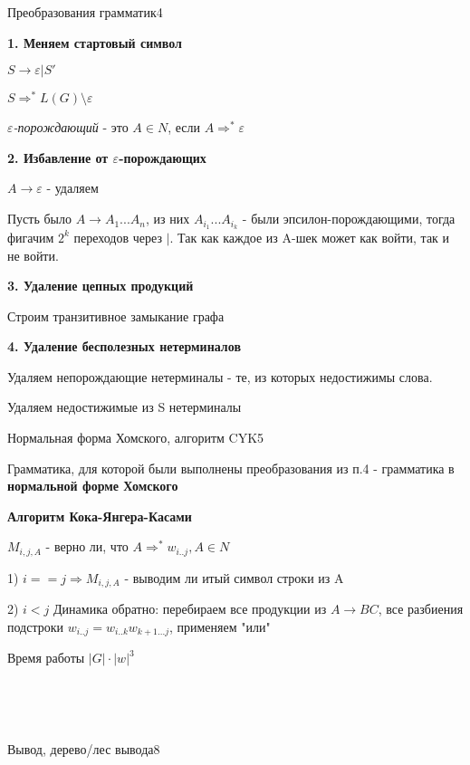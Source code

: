 \documentclass{article}
\begin{document}
\begin{question}{Преобразования грамматик}{4}

\textbf{1. Меняем стартовый символ}

$S \rightarrow \varepsilon |S'$

$S \Rightarrow^* L(G) \setminus {\varepsilon}$

\textit{$\varepsilon$-порождающий} - это $A \in N$, если $A \Rightarrow^* \varepsilon$

\textbf{2. Избавление от $\varepsilon$-порождающих}

$A \rightarrow \varepsilon$ - удаляем

Пусть было $A \rightarrow A_1 ... A_n$, из них $A_{i_1} ... A_{i_k}$ - были эпсилон-порождающими, тогда фигачим $2^k$ переходов через $|$. Так как каждое из A-шек может как войти, так и не войти.

\textbf{3. Удаление цепных продукций}

Строим транзитивное замыкание графа

\textbf{4. Удаление бесполезных нетерминалов}

Удаляем непорождающие нетерминалы - те, из которых недостижимы слова.

Удаляем недостижимые из S нетерминалы

\end{question}



\begin{question}{Нормальная форма Хомского, алгоритм CYK}{5}

Грамматика, для которой были выполнены преобразования из п.4 - грамматика в \textbf{нормальной форме Хомского}

\textbf{Алгоритм Кока-Янгера-Касами}

$M_{i,j,A}$ - верно ли, что $A \Rightarrow^* w_{i..j}, A \in N$

1) $i == j \Rightarrow M_{i,j,A}$ - выводим ли итый символ строки из A

2) $i < j$ Динамика обратно: перебираем все продукции из $A \rightarrow BC$, все разбиения подстроки $w_{i..j} = w_{i..k}w_{k+1...j}$, применяем "или"

Время работы $|G| \cdot |w|^3$

\end{question}

~\

~\

\begin{question}{Вывод, дерево/лес вывода}{8}



\end{question}
\end{document}
